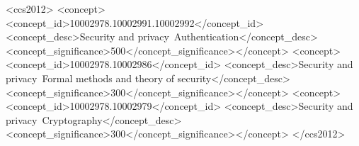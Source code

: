\documentclass[sigconf,anonymous,review]{acmart}
\begin{document}
\begin{CCSXML}
<ccs2012>
<concept><concept_id>10002978.10002991.10002992</concept_id>
<concept_desc>Security and privacy~Authentication</concept_desc><concept_significance>500</concept_significance></concept>
<concept><concept_id>10002978.10002986</concept_id>
<concept_desc>Security and privacy~Formal methods and theory of security</concept_desc><concept_significance>300</concept_significance></concept>
<concept><concept_id>10002978.10002979</concept_id>
<concept_desc>Security and privacy~Cryptography</concept_desc><concept_significance>300</concept_significance></concept>
</ccs2012>
\end{CCSXML}


\maketitle















\appendix





\end{document}
